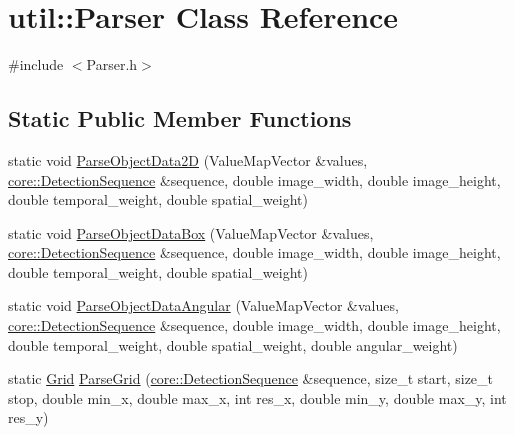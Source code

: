 \hypertarget{classutil_1_1Parser}{}\section{util\+:\+:Parser Class Reference}
\label{classutil_1_1Parser}


{\ttfamily \#include $<$Parser.\+h$>$}

\subsection*{Static Public Member Functions}
\begin{DoxyCompactItemize}
\item 
static void \hyperlink{classutil_1_1Parser_abcf27fbfdf936204064e3e3c0ff27d9e}{Parse\+Object\+Data2D} (Value\+Map\+Vector \&values, \hyperlink{classcore_1_1DetectionSequence}{core\+::\+Detection\+Sequence} \&sequence, double image\+\_\+width, double image\+\_\+height, double temporal\+\_\+weight, double spatial\+\_\+weight)
\item 
static void \hyperlink{classutil_1_1Parser_a4286ab16cc0aff0669ca5a876411d532}{Parse\+Object\+Data\+Box} (Value\+Map\+Vector \&values, \hyperlink{classcore_1_1DetectionSequence}{core\+::\+Detection\+Sequence} \&sequence, double image\+\_\+width, double image\+\_\+height, double temporal\+\_\+weight, double spatial\+\_\+weight)
\item 
static void \hyperlink{classutil_1_1Parser_a271db7290aece47fca8fcd1734f47499}{Parse\+Object\+Data\+Angular} (Value\+Map\+Vector \&values, \hyperlink{classcore_1_1DetectionSequence}{core\+::\+Detection\+Sequence} \&sequence, double image\+\_\+width, double image\+\_\+height, double temporal\+\_\+weight, double spatial\+\_\+weight, double angular\+\_\+weight)
\item 
static \hyperlink{classutil_1_1Grid}{Grid} \hyperlink{classutil_1_1Parser_ab5d42421adbcb880ffe633981e3226e4}{Parse\+Grid} (\hyperlink{classcore_1_1DetectionSequence}{core\+::\+Detection\+Sequence} \&sequence, size\+\_\+t start, size\+\_\+t stop, double min\+\_\+x, double max\+\_\+x, int res\+\_\+x, double min\+\_\+y, double max\+\_\+y, int res\+\_\+y)
\end{DoxyCompactItemize}

